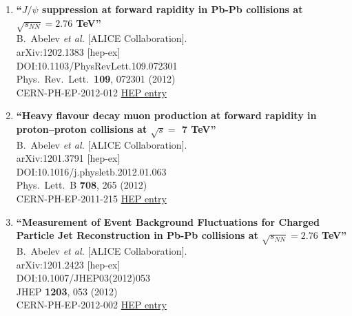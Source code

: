 \begin{enumerate}
\item%
{\bf ``$J/\psi$ suppression at forward rapidity in Pb-Pb collisions at $\sqrt{s_{NN}}=2.76$ TeV''}
  \\{}B.~Abelev {\it et al.} [ALICE Collaboration].
  \\{}arXiv:1202.1383 [hep-ex]
  \\{}DOI:10.1103/PhysRevLett.109.072301
  \\{}Phys.\ Rev.\ Lett.\  {\bf 109}, 072301 (2012)
  \\{}CERN-PH-EP-2012-012
\href{http://inspirehep.net/record/1088222}{HEP entry}
\item%
{\bf ``Heavy flavour decay muon production at forward rapidity in proton–proton collisions at $\sqrt{s} =$ 7 TeV''}
  \\{}B.~Abelev {\it et al.} [ALICE Collaboration].
  \\{}arXiv:1201.3791 [hep-ex]
  \\{}DOI:10.1016/j.physletb.2012.01.063
  \\{}Phys.\ Lett.\ B {\bf 708}, 265 (2012)
  \\{}CERN-PH-EP-2011-215
\href{http://inspirehep.net/record/1084981}{HEP entry}
\item%
{\bf ``Measurement of Event Background Fluctuations for Charged Particle Jet Reconstruction in Pb-Pb collisions at $\sqrt{s_{NN}} = 2.76$ TeV''}
  \\{}B.~Abelev {\it et al.} [ALICE Collaboration].
  \\{}arXiv:1201.2423 [hep-ex]
  \\{}DOI:10.1007/JHEP03(2012)053
  \\{}JHEP {\bf 1203}, 053 (2012)
  \\{}CERN-PH-EP-2012-002
\href{http://inspirehep.net/record/1084331}{HEP entry}

\end{enumerate}